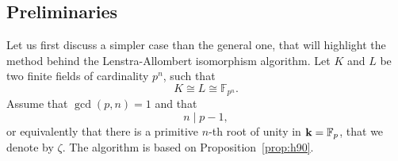 %

\subsection{Preliminaries}
\label{sec:preliminaries}

Let us first discuss a simpler case than the general one, that will highlight
the method behind the Lenstra-Allombert isomorphism algorithm. Let $K$ and $L$ be
two finite fields of cardinality $p^n$, such that
\[
  K\cong L\cong \mathbb{F}_{p^n}.
\]
Assume that $\gcd(p, n)=1$ and that
\[
  n\mid p-1,
\]
or equivalently that there is a primitive $n$-th root of unity in
$\mathbf{k}=\mathbb{F}_p$, that we denote by $\zeta$. The algorithm is based on
Proposition~\ref{prop:h90}.

